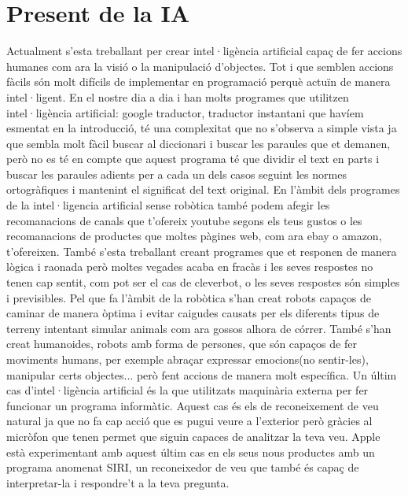 \section {Present de la IA}
Actualment s'esta treballant per crear intel·ligència artificial capaç de fer accions humanes com ara la visió o la manipulació d'objectes. Tot i que semblen accions fàcils
són molt difícils de implementar en programació perquè actuïn de manera intel·ligent. En el nostre dia a dia i han molts programes que utilitzen intel·ligència artificial:
google traductor, traductor instantani que havíem esmentat en la introducció, té una complexitat que no s'observa a simple vista ja que sembla molt fàcil buscar al diccionari
i buscar les paraules que et demanen, però no es té en compte que aquest programa té que dividir el text en parts i buscar les paraules adients per a cada un dels casos seguint
les normes ortogràfiques i mantenint el significat del text original. En l'àmbit dels programes de la intel·ligencia artificial sense robòtica també podem afegir les recomanacions
de canals que t'ofereix youtube segons els teus gustos o les recomanacions de productes que moltes pàgines web, com ara ebay o amazon, t'ofereixen. També s'esta treballant creant
programes que et responen de manera lògica i raonada però moltes vegades acaba en fracàs i les seves respostes no tenen cap sentit, com pot ser el cas de cleverbot, o les seves
respostes són simples i previsibles.
Pel que fa l'àmbit de la robòtica s'han creat robots capaços de caminar de manera òptima i evitar caigudes causats per els diferents tipus de terreny intentant simular animals com
ara gossos alhora de córrer. També s'han creat humanoides, robots amb forma de persones, que són capaços de fer moviments humans, per exemple abraçar expressar emocions(no sentir-les),
manipular certs objectes... però fent accions de manera molt específica.
Un últim cas d'intel·ligència artificial és la que utilitzats maquinària externa per fer funcionar un programa informàtic. Aquest cas és els de reconeixement de veu natural ja que no
fa cap acció que es pugui veure a l'exterior però gràcies al micròfon que tenen permet que siguin capaces de analitzar la teva veu. Apple està experimentant amb aquest últim cas en els
seus nous productes amb un programa anomenat SIRI, un reconeixedor de veu que també és capaç de interpretar-la i respondre't a la teva pregunta.

